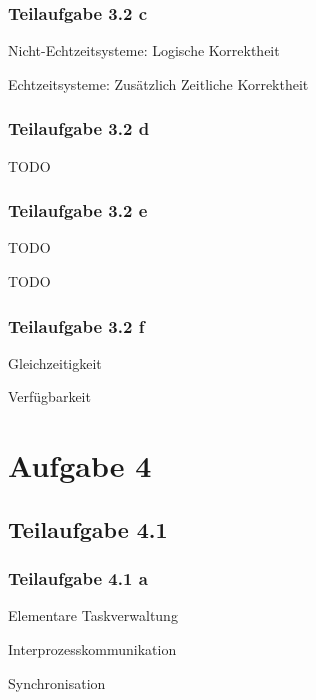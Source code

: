 \documentclass[a4paper]{scrartcl}
\begin{document}
  \subsubsection*{Teilaufgabe 3.2 c}
  Nicht-Echtzeitsysteme: Logische Korrektheit

  Echtzeitsysteme: Zusätzlich Zeitliche Korrektheit


  \subsubsection*{Teilaufgabe 3.2 d}
  TODO

  \subsubsection*{Teilaufgabe 3.2 e}
  \begin{enumerate*}[label=(\arabic*)]
      \item TODO
      \item TODO
  \end{enumerate*}

  \subsubsection*{Teilaufgabe 3.2 f}
  \begin{enumerate*}[label=(\arabic*)]
      \item Gleichzeitigkeit
      \item Verfügbarkeit
  \end{enumerate*}

  \section*{Aufgabe 4}
  \subsection*{Teilaufgabe 4.1}
  \subsubsection*{Teilaufgabe 4.1 a}
  \begin{enumerate*}[label=(\arabic*)]
      \item Elementare Taskverwaltung
      \item Interprozesskommunikation
      \item Synchronisation
  \end{enumerate*}
\end{document}
